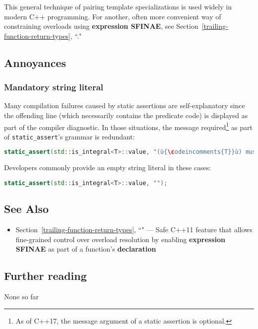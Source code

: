 \noindent This general technique of pairing template specializations is used widely
in modern C++ programming. For another, often more convenient way of
constraining overloads using \textbf{expression SFINAE}, see Section~\ref{trailing-function-return-types}, ``."

\subsection[Annoyances]{Annoyances}\label{static-annoyances}

\subsubsection[Mandatory string literal]{Mandatory string literal}\label{mandatory-string-literal}

Many compilation failures caused by static assertions are
self-explanatory since the offending line (which necessarily contains the
predicate code) is displayed as part of the compiler diagnostic. In
those situations, the message required{\cprotect\footnote{As of C++17,
the message argument of a static assertion is optional.}} as part of
\texttt{static\_assert}'s grammar is redundant:

\begin{lstlisting}[language=C++]
static_assert(std::is_integral<T>::value, "(ù{\codeincomments{T}}ù) must be an integral type.");
\end{lstlisting}

\noindent Developers commonly provide an empty string literal in these
cases:

\begin{lstlisting}[language=C++]
static_assert(std::is_integral<T>::value, "");
\end{lstlisting}


\subsection[See Also]{See Also}\label{see-also}

\begin{itemize}
\item{Section~\ref{trailing-function-return-types}, ``" — Safe C++11 feature that allows fine-grained control over overload resolution by enabling \textbf{expression SFINAE} as part of a function’s \textbf{declaration}}
\end{itemize}

\subsection[Further reading]{Further reading}\label{further-reading}

None so far



